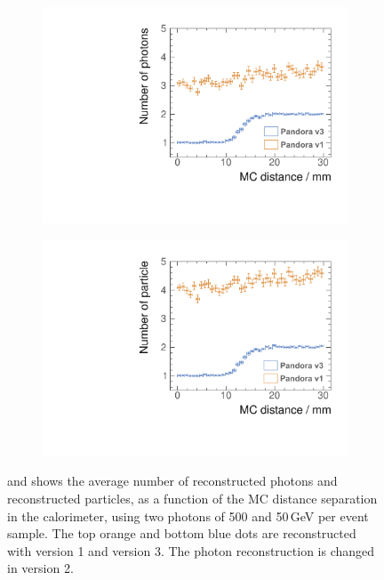 \begin{figure}[tbph]
\centering
    \begin{subfigure}[b]{0.45\textwidth}
        \includegraphics[width=\textwidth]{photon/DoubleCompareN_p3edit.pdf}
        \caption{}
        \label{fig:photonDoubleCompareN_p}
    \end{subfigure}
    \begin{subfigure}[b]{0.45\textwidth}
        \includegraphics[width=\textwidth]{photon/DoubleCompareN_all2edit.pdf}
        \caption{}
        \label{fig:photonDoubleCompareN_all}
    \end{subfigure}
\caption[Average number of reconstructed photons and reconstructed particles, as a function of the MC distance separation.]
{ and  shows the average number of reconstructed photons and reconstructed particles, as a function of the MC distance separation in the calorimeter, using two photons of 500 and 50\,GeV per event sample. The top orange and bottom blue dots are reconstructed with \pandora version 1 and version 3. The photon reconstruction is changed in \pandora version 2.}
\label{fig:photonDoubleCompareN}
\end{figure}

